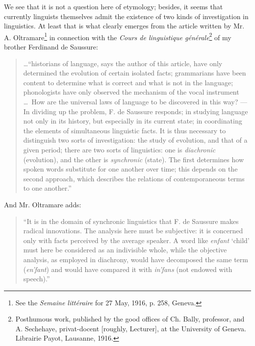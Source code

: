 {  We see that it is not a question here of etymology; besides, it
  seems that currently linguists themselves admit the existence of two
  kinds of investigation in linguistics. At least that is what clearly
  emerges from the article written by Mr. A. Oltramare\footnote{See
    the \emph{Semaine littéraire} for 27 May, 1916, p. 258, Geneva.}
  in connection with the \emph{Cours de linguistique
    générale}\footnote{Posthumous work, published by the good
    offices of Ch. Bally, professor, and A. Sechehaye, privat-docent
    {[roughly, Lecturer]}, at the University of Geneva. Librairie
    Payot, Lausanne, 1916.} of my brother Ferdinand de Saussure:
  \begin{quotation}
    \ldots ``historians of language, says the author of this article,
    have only determined the evolution of certain isolated facts;
    grammarians have been content to determine what is correct and
    what is not in the language; phonologists have only observed the
    mechanism of the vocal instrument \ldots\ How are the universal
    laws of language to be discovered in this way? --- In dividing up
    the problem, F. de Saussure responds; in studying language not
    only in its history, but especially in its current state; in
    coordinating the elements of simultaneous linguistic facts.  It is
    thus necessary to distinguish two sorts of investigation: the
    study of evolution, and that of a given period; there are two
    sorts of linguistics: one is \emph{diachronic} (evolution), and
    the other is \emph{synchronic} (state). The first determines how
    spoken words substitute for one another over time; this depends on
    the second approach, which describes the relations of
    contemporaneous terms to one another.''
  \end{quotation}

  \noindent
  And Mr. Oltramare adds:

  \begin{quotation}
    ``It is in the domain of synchronic linguistics that F. de
    Saussure makes radical innovations. The analysis here must be
    subjective: it is concerned only with facts perceived by the
    average speaker. A word like \emph{enfant} `child' must here be
    considered as an indivisible whole, while the objective analysis,
    as employed in diachrony, would have decomposed the same term
    (\emph{en'fant}) and would have compared it with \emph{in'fans}
    (not endowed with speech).''
  \end{quotation}
}

